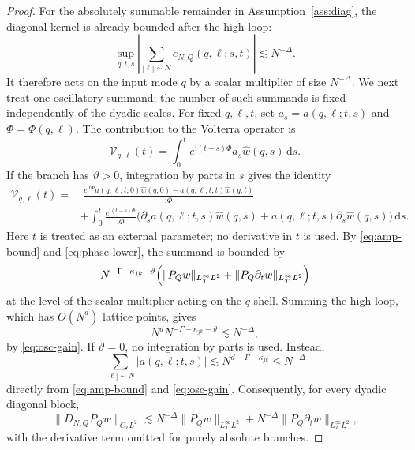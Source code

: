 \documentclass[10pt,a4paper]{amsart}
\newcommand{\dd}{\,\mathrm d}
\newcommand{\ii}{\mathrm i}
\begin{document}
\begin{proof}
For the absolutely summable remainder in Assumption~\ref{ass:diag}, the diagonal kernel is already bounded after the high loop:
\begin{equation}\label{eq:D-rem-mult}
        \sup_{q,t,s}\left|\sum_{|\ell|\sim N}e_{N,Q}(q,\ell;s,t)\right|
        \lesssim N^{-\Delta}.
\end{equation}
It therefore acts on the input mode \(q\) by a scalar multiplier of size \(N^{-\Delta}\).  We next treat one oscillatory summand; the number of such summands is fixed independently of the dyadic scales.  For fixed \(q,\ell,t\), set \(a_s=a(q,\ell;t,s)\) and \(\Phi=\Phi(q,\ell)\).  The contribution to the Volterra operator is
\begin{equation}\label{eq:D-osc-one}
        \mathcal V_{q,\ell}(t)
        =\int_0^t e^{\ii(t-s)\Phi}a_s\widehat w(q,s)\dd s .
\end{equation}
If the branch has \(\vartheta>0\), integration by parts in \(s\) gives the identity
\begin{equation}\label{eq:D-IBP-full}
\begin{aligned}
        \mathcal V_{q,\ell}(t)
        =&\ \frac{e^{\ii t\Phi}a(q,\ell;t,0)\widehat w(q,0)
        -a(q,\ell;t,t)\widehat w(q,t)}{\ii\Phi} \\
        &+\int_0^t\frac{e^{\ii(t-s)\Phi}}{\ii\Phi}
        \bigl(\partial_sa(q,\ell;t,s)\widehat w(q,s)
        +a(q,\ell;t,s)\partial_s\widehat w(q,s)\bigr)\dd s .
\end{aligned}
\end{equation}
Here \(t\) is treated as an external parameter; no derivative in \(t\) is used.  By \eqref{eq:amp-bound} and \eqref{eq:phase-lower}, the summand is bounded by
\begin{equation}\label{eq:D-one-summand}
        N^{-\Gamma-\kappa_{jk}-\vartheta}
        \Bigl(\|P_Qw\|_{L_T^\infty L^2}
        +\|P_Q\partial_tw\|_{L_T^\infty L^2}\Bigr)
\end{equation}
at the level of the scalar multiplier acting on the \(q\)-shell.  Summing the high loop, which has \(O(N^d)\) lattice points, gives
\begin{equation}\label{eq:D-shell-size-refined}
        N^dN^{-\Gamma-\kappa_{jk}-\vartheta}
        \lesssim N^{-\Delta},
\end{equation}
by \eqref{eq:osc-gain}.  If \(\vartheta=0\), no integration by parts is used.  Instead,
\[
        \sum_{|\ell|\sim N}|a(q,\ell;t,s)|
        \lesssim N^{d-\Gamma-\kappa_{jk}}
        \le N^{-\Delta}
\]
directly from \eqref{eq:amp-bound} and \eqref{eq:osc-gain}.  Consequently,
for every dyadic diagonal block,
\begin{equation}\label{eq:D-dyadic-L2-refined}
        \|D_{N,Q}P_Qw\|_{C_TL^2}
        \lesssim
        N^{-\Delta}\|P_Qw\|_{L_T^\infty L^2}
        +N^{-\Delta}\|P_Q\partial_tw\|_{L_T^\infty L^2},
\end{equation}
with the derivative term omitted for purely absolute branches.


\end{proof}
\end{document}
